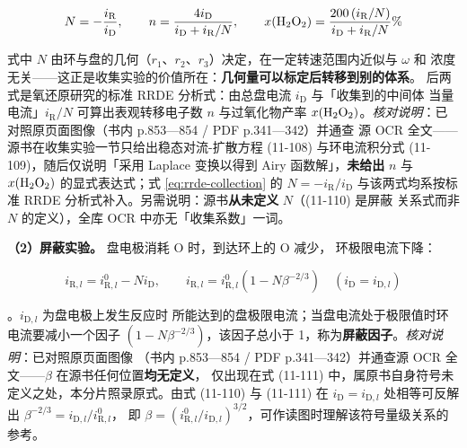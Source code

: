 \begin{equation}
N=-\frac{i_{\mathrm{R}}}{i_{\mathrm{D}}},
\qquad
n=\frac{4i_{\mathrm{D}}}{i_{\mathrm{D}}+i_{\mathrm{R}}/N},
\qquad
x(\ce{H2O2})=\frac{200\,(i_{\mathrm{R}}/N)}{i_{\mathrm{D}}+i_{\mathrm{R}}/N}\%
\label{eq:rrde-collection}
\end{equation}

式中 $N$ 由环与盘的几何（$r_1$、$r_2$、$r_3$）决定，在一定转速范围内近似与 $\omega$ 和
浓度无关——这正是收集实验的价值所在：\textbf{几何量可以标定后转移到别的体系}。
后两式是氧还原研究的标准 RRDE 分析式：由总盘电流 $i_{\mathrm{D}}$ 与「收集到的中间体
当量电流」$i_{\mathrm{R}}/N$ 可算出表观转移电子数 $n$ 与过氧化物产率
$x(\ce{H2O2})$。\emph{核对说明}：已对照原页面图像（书内 p.853—854 / PDF p.341—342）并通查
源 OCR 全文——源书在收集实验一节只给出稳态对流-扩散方程 (11-108) 与环电流积分式
(11-109)，随后仅说明「采用 Laplace 变换以得到 Airy 函数解」，\textbf{未给出} $n$ 与
$x(\ce{H2O2})$ 的显式表达式；式 \eqref{eq:rrde-collection} 的 $N=-i_{\mathrm{R}}/i_{\mathrm{D}}$
与该两式均系按标准 RRDE 分析式补入。另需说明：源书\textbf{从未定义} $N$（(11-110) 是屏蔽
关系式而非 $N$ 的定义），全库 OCR 中亦无「收集系数」一词。

\textbf{（2）屏蔽实验。} 盘电极消耗 $\mathrm{O}$ 时，到达环上的 $\mathrm{O}$ 减少，
环极限电流下降：

\begin{equation}
i_{\mathrm{R},l}=i_{\mathrm{R},l}^{0}-Ni_{\mathrm{D}},
\qquad
i_{\mathrm{R},l}=i_{\mathrm{R},l}^{0}\left(1-N\beta^{-2/3}\right)
\quad(i_{\mathrm{D}}=i_{\mathrm{D},l})
\label{eq:rrde-shield}
\end{equation}

。$i_{\mathrm{D},l}$ 为盘电极上发生反应时
所能达到的盘极限电流；当盘电流处于极限值时环电流要减小一个因子
$(1-N\beta^{-2/3})$，该因子总小于 1，称为\textbf{屏蔽因子}。\emph{核对说明}：已对照原页面图像
（书内 p.853—854 / PDF p.341—342）并通查源 OCR 全文——$\beta$ 在源书任何位置\textbf{均无定义}，
仅出现在式 (11-111) 中，属原书自身符号未定义之处，本分片照录原式。由式 (11-110) 与 (11-111)
在 $i_{\mathrm{D}}=i_{\mathrm{D},l}$ 处相等可反解出 $\beta^{-2/3}=i_{\mathrm{D},l}/i_{\mathrm{R},l}^{0}$，
即 $\beta=(i_{\mathrm{R},l}^{0}/i_{\mathrm{D},l})^{3/2}$，可作读图时理解该符号量级关系的参考。

